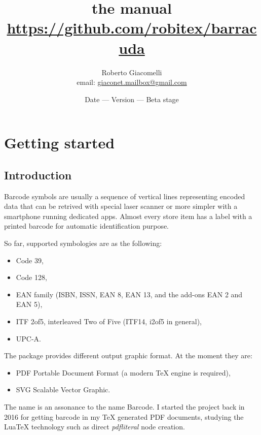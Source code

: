 \documentclass[11pt,a4paper]{article}
\author{Roberto Giacomelli\\\small email: \url{giaconet.mailbox@gmail.com}}
\title{the \code{barracuda} manual\\[1ex]
\small \url{https://github.com/robitex/barracuda}}
\date{\small Date \brcdkey{date} --- Version \brcdkey{version} --- Beta stage}
\begin{document}
\maketitle


\tableofcontents
\newpage


\section{Getting started}
\label{secStart}

\subsection{Introduction}
\label{secIntro}

Barcode symbols are usually a sequence of vertical lines representing encoded
data that can be retrived with special laser scanner or more simpler with a
smartphone running dedicated apps. Almost every store item has a label with a
printed barcode for automatic identification purpose.

So far, \brcd{} supported symbologies are as the following:
\begin{itemize}
\item Code 39,
\item Code 128,
\item EAN family (ISBN, ISSN, EAN 8, EAN 13, and the add-ons EAN 2 and EAN 5),
\item ITF 2of5, interleaved Two of Five (ITF14, i2of5 in general),
\item UPC-A.
\end{itemize}

The package provides different output graphic format. At the moment they are:
\begin{itemize}
\item PDF Portable Document Format (a modern \TeX{} engine is required),
\item SVG Scalable Vector Graphic.
\end{itemize}

The name \brcd{} is an assonance to the name Barcode. I started the project back
in 2016 for getting barcode in my \TeX{} generated PDF documents, studying the
Lua\TeX{} technology such as direct \emph{pdfliteral} node creation.
\end{document}
